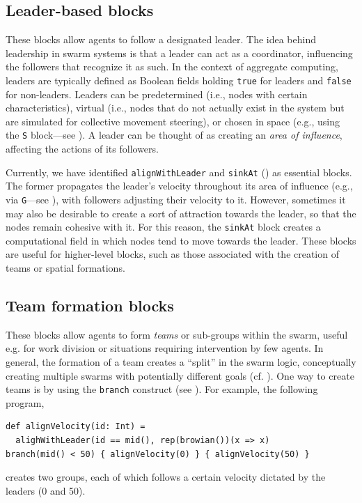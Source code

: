 \subsection{Leader-based blocks}\label{coordination2023-macro:subsec:leader}
These blocks allow agents to follow a designated leader.
The idea behind leadership in swarm systems is that a leader 
 can act as a coordinator, influencing the followers that recognize it as such. 
% 
In the context of aggregate computing, 
 leaders are typically defined as Boolean fields holding \lstinline|true| for leaders 
 and \lstinline|false| for non-leaders. 
%
Leaders can be predetermined (i.e., nodes with certain characteristics), 
 virtual (i.e., nodes that do not actually exist in the system but are simulated for collective movement steering),
 or chosen in space (e.g., using the \lstinline|S| block---see ). %
% 
A leader can be thought of as creating an \emph{area of influence}, affecting the actions of its followers.

Currently, we have identified \lstinline|alignWithLeader| and \lstinline|sinkAt| () 
 as essential blocks. 
%
The former propagates the leader's velocity throughout 
 its area of influence (e.g., via \lstinline|G|---see ),
 with followers adjusting their velocity to it. 
%
However, sometimes it may also be desirable 
 to create a sort of attraction towards the leader, 
 so that the nodes remain cohesive with it. 
For this reason, the  \lstinline|sinkAt| block creates a computational field 
 in which nodes tend to move towards the leader. 
% 
These blocks are useful for higher-level blocks, 
 such as those associated with the creation of teams or spatial formations.
 
\subsection{Team formation blocks}\label{coordination2023-macro:subsec:team}
These blocks allow agents to form \emph{teams} or sub-groups within the swarm,
 useful e.g. for work division
 or situations requiring intervention by few agents.
% 
% 
In general, the formation of a team creates a ``split'' in the swarm logic, 
 conceptually creating multiple swarms with potentially different goals (cf. ).
One way to create teams is by using the \lstinline|branch| construct (see ). 
For example, the following program,
\begin{lstlisting}
def alignVelocity(id: Int) = 
  alighWithLeader(id == mid(), rep(browian())(x => x)
branch(mid() < 50) { alignVelocity(0) } { alignVelocity(50) }
\end{lstlisting}
creates two groups, each of which follows a certain velocity dictated by the leaders (0 and 50).

